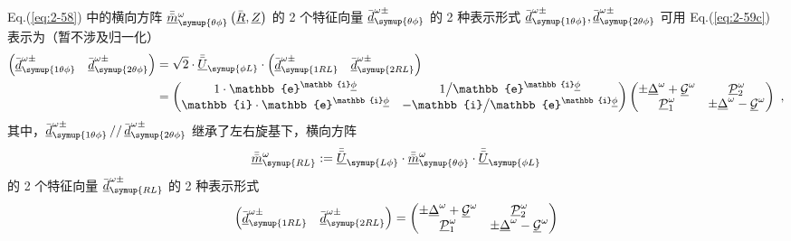 Eq.(\ref{eq:2-58}) 中的横向方阵 $\bar{\bar{\underline{m}}}^{\omega}_{\symup{\theta\phi}} \left( \bar{\underline{R}}, \underline{Z} \right)$ 的 2 个特征向量 $\bar{\underline{d}}^{\omega\pm}_{\symup{\theta\phi}}$ 的 2 种表示形式  $\bar{\underline{d}}^{\omega\pm}_{\symup{1\theta\phi}},\bar{\underline{d}}^{\omega\pm}_{\symup{2\theta\phi}}$ 可用 Eq.(\ref{eq:2-59c}) 表示为（暂不涉及归一化）
\begin{subequations} \label{eq:2-64}
\begin{align}
	\begin{pmatrix} \bar{\underline{d}}^{\omega\pm}_{\symup{1\theta\phi}} & \bar{\underline{d}}^{\omega\pm}_{\symup{2\theta\phi}} \end{pmatrix} &= \sqrt{2} \cdot \bar{\bar{\underline{U}}}_{\symup{\phi L}} \cdot \begin{pmatrix} \bar{\underline{d}}^{\omega\pm}_{\symup{1RL}} & \bar{\underline{d}}^{\omega\pm}_{\symup{2RL}} \end{pmatrix} \label{eq:2-64a}\\ &= \begin{pmatrix} 1 \cdot \mathbb{e}^{\mathbb{i}\underline{\phi}} & 1 \big/ \mathbb{e}^{\mathbb{i}\underline{\phi}} \\ \mathbb{i} \cdot \mathbb{e}^{\mathbb{i}\underline{\phi}} & -\mathbb{i} \big/ \mathbb{e}^{\mathbb{i}\underline{\phi}} \end{pmatrix} \begin{pmatrix} \pm \underline{\Delta}^\omega + \underline{\mathcal{G}}^{\omega} & \underline{\mathcal{P}}^{\omega}_{2} \\ \underline{\mathcal{P}}^{\omega}_{1} & \pm \underline{\Delta}^\omega - \underline{\mathcal{G}}^{\omega} \end{pmatrix} \label{eq:2-64b}~,
\end{align}
\end{subequations}
其中，$\bar{\underline{d}}^{\omega\pm}_{\symup{1\theta\phi}} \mathop{//} \bar{\underline{d}}^{\omega\pm}_{\symup{2\theta\phi}}$ 继承了左右旋基下，横向方阵
\begin{equation} \label{eq:2-65}
	\bar{\bar{\underline{m}}}^{\omega}_{\symup{RL}} := \bar{\bar{\underline{U}}}_{\symup{L \phi}} \cdot \bar{\bar{\underline{m}}}^{\omega}_{\symup{\theta\phi}} \cdot \bar{\bar{\underline{U}}}_{\symup{\phi L}}
\end{equation}
的 2 个特征向量 $\bar{\underline{d}}^{\omega\pm}_{\symup{RL}}$ 的 2 种表示形式
\begin{equation} \label{eq:2-66}
	\begin{pmatrix} \bar{\underline{d}}^{\omega\pm}_{\symup{1RL}} & \bar{\underline{d}}^{\omega\pm}_{\symup{2RL}} \end{pmatrix} = \begin{pmatrix} \pm \underline{\Delta}^\omega + \underline{\mathcal{G}}^{\omega} & \underline{\mathcal{P}}^{\omega}_{2} \\ \underline{\mathcal{P}}^{\omega}_{1} & \pm \underline{\Delta}^\omega - \underline{\mathcal{G}}^{\omega} \end{pmatrix}
\end{equation}
